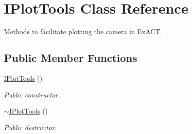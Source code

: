 \hypertarget{classIPlotTools}{}\section{I\+Plot\+Tools Class Reference}
\label{classIPlotTools}


Methods to facilitate plotting the camera in Ex\+A\+CT.  


\subsection*{Public Member Functions}
\begin{DoxyCompactItemize}
\item 
\mbox{\label{classIPlotTools_ac2b1bdd22c8ffe2ed5fa11ea206a666f}} 
\hyperlink{classIPlotTools_ac2b1bdd22c8ffe2ed5fa11ea206a666f}{I\+Plot\+Tools} ()
\begin{DoxyCompactList}\small\item\em Public constructor. \end{DoxyCompactList}\item 
\mbox{\label{classIPlotTools_a589ad6d93c9144cde064faaafd0eb9fe}} 
\hyperlink{classIPlotTools_a589ad6d93c9144cde064faaafd0eb9fe}{$\sim$\+I\+Plot\+Tools} ()
\begin{DoxyCompactList}\small\item\em Public destructor. \end{DoxyCompactList}\end{DoxyCompactItemize}
